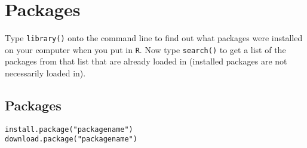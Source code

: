 
\section{Packages}

Type \texttt{library()} onto the command line to find out what packages were installed on your computer
when you put in \texttt{R}. Now type \texttt{search()} to get a list of the packages from that list that are
already loaded in (installed packages are not necessarily loaded in). 



\subsection{Packages}

\begin{verbatim}
install.package("packagename")
download.package("packagename")
\end{verbatim}


